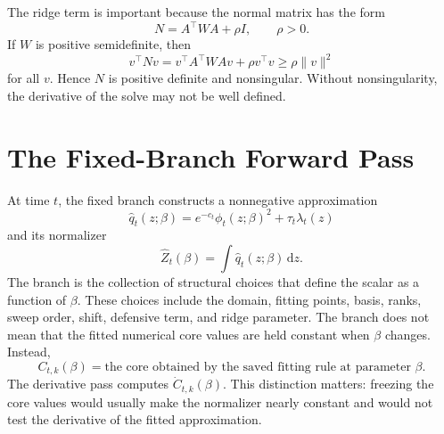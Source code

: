 \documentclass[11pt]{article}
\theoremstyle{remark}
\newcommand{\dd}{\,\mathrm d}
\begin{document}
The ridge term is important because the normal matrix has the form
\[
    N=A^\top W A+\rho I,
    \qquad \rho>0.
    \tag{42}
\]
If \(W\) is positive semidefinite, then
\[
    v^\top N v
    =
    v^\top A^\top W A v+\rho v^\top v
    \ge
    \rho\|v\|^2
    \tag{43}
\]
for all \(v\).  Hence \(N\) is positive definite and nonsingular.  Without
nonsingularity, the derivative of the solve may not be well defined.

\section{The Fixed-Branch Forward Pass}

At time \(t\), the fixed branch constructs a nonnegative approximation
\[
    \widehat q_t(z;\beta)
    =
    e^{-c_t}\phi_t(z;\beta)^2+\tau_t\lambda_t(z)
    \tag{44}
\]
and its normalizer
\[
    \widehat Z_t(\beta)=\int \widehat q_t(z;\beta)\dd z.
    \tag{45}
\]
The branch is the collection of structural choices that define the scalar as a
function of \(\beta\).  These choices include the domain, fitting points, basis,
ranks, sweep order, shift, defensive term, and ridge parameter.  The branch does
not mean that the fitted numerical core values are held constant when
\(\beta\) changes.  Instead,
\[
    C_{t,k}(\beta)
    =
    \text{the core obtained by the saved fitting rule at parameter }\beta.
    \tag{45a}
\]
The derivative pass computes \(\dot C_{t,k}(\beta)\).  This distinction matters:
freezing the core values would usually make the normalizer nearly constant and
would not test the derivative of the fitted approximation.
\end{document}
